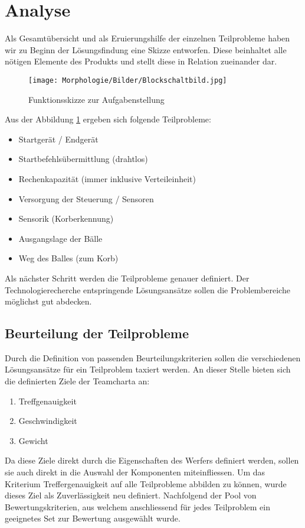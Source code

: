 \section{Analyse}
	Als Gesamtübersicht und als Eruierungshilfe der einzelnen Teilprobleme haben wir zu Beginn der Lösungsfindung eine Skizze entworfen. Diese beinhaltet alle nötigen Elemente des Produkts und stellt diese in Relation zueinander dar. 
	
	\begin{figure}[h!]
		\texttt{[image: Morphologie/Bilder/Blockschaltbild.jpg]}
		\centering
		\caption{Funktionsskizze zur Aufgabenstellung}
		\label{abb:Blockschaltbild} 
	\end{figure}
	
	Aus der Abbildung \ref{abb:Blockschaltbild} ergeben sich folgende Teilprobleme:
	\begin{itemize}
		\item Startgerät / Endgerät
		\item Startbefehlsübermittlung (drahtlos)
		\item Rechenkapazität (immer inklusive Verteileinheit)
		\item Versorgung der Steuerung / Sensoren
		\item Sensorik (Korberkennung)
		\item Ausgangslage der Bälle
		\item Weg des Balles (zum Korb)
	\end{itemize}
	Als nächster Schritt werden die Teilprobleme genauer definiert. Der Technologierecherche entspringende Lösungsansätze sollen die Problembereiche möglichst gut abdecken.
	
	\subsection{Beurteilung der Teilprobleme}
		Durch die Definition von passenden Beurteilungskriterien sollen die verschiedenen Lösungsansätze für ein Teilproblem taxiert werden. An dieser Stelle bieten sich die definierten Ziele der Teamcharta an:
		
		\begin{enumerate}
			\item Treffgenauigkeit
			\item Geschwindigkeit
			\item Gewicht
		\end{enumerate}		
		Da diese Ziele direkt durch die Eigenschaften des Werfers definiert werden, sollen sie auch direkt in die Auswahl der Komponenten miteinfliessen. Um das Kriterium Treffergenauigkeit auf alle Teilprobleme abbilden zu können, wurde dieses Ziel als Zuverlässigkeit neu definiert. Nachfolgend der Pool von Bewertungskriterien, aus welchem anschliessend für jedes Teilproblem ein geeignetes Set zur Bewertung ausgewählt wurde.
		
